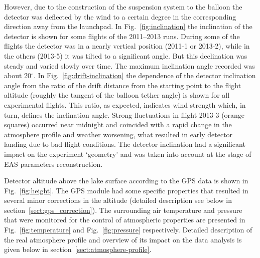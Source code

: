 \documentclass[final,5p,times,twocolumn]{elsarticle}
\begin{document}
However, due to the construction of the suspension system to the balloon the detector was deflected by the wind to a certain degree in the corresponding direction away from the launchpad. In Fig.~\ref{fig:inclination} the inclination of the detector is shown for some flights of the 2011--2013 runs. During some of the flights the detector was in a nearly vertical position (2011-1 or 2013-2), while in the others (2013-5) it was tilted to a significant angle. But this declination was steady and varied slowly over time. The maximum inclination angle recorded was about 20$^\circ$. In Fig.~\ref{fig:drift-inclination} the dependence of the detector inclination angle from the ratio of the drift distance from the starting point to the flight altitude (roughly the tangent of the balloon tether angle) is shown for all experimental flights. This ratio, as expected, indicates wind strength which, in turn, defines the inclination angle. Strong fluctuations in flight 2013-3 (orange squares) occurred near midnight and coincided with a rapid change in the atmosphere profile and weather worsening, what resulted in early detector landing due to bad flight conditions. The detector inclination had a significant impact on the experiment `geometry' and was taken into account at the stage of EAS parameters reconstruction.

Detector altitude above the lake surface according to the GPS data is shown in Fig.~\ref{fig:height}. The GPS module had some specific properties that resulted in several minor corrections in the altitude (detailed description see below in section~\ref{sect:gps_correction}). The surrounding air temperature and pressure that were monitored for the control of atmospheric properties are presented in Fig.~\ref{fig:temperature} and Fig.~\ref{fig:pressure} respectively. Detailed description of the real atmosphere profile and overview of its impact on the data analysis is given below in section~\ref{sect:atmosphere-profile}.
\end{document}
